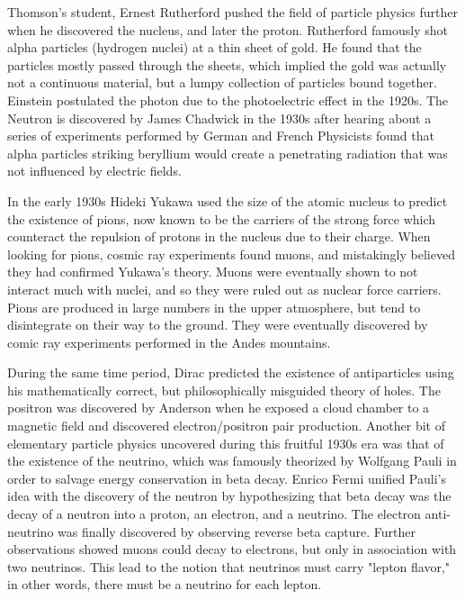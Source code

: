    Thomson's student, Ernest Rutherford pushed the field of particle physics further when he discovered the nucleus, and later the proton. Rutherford famously shot alpha particles (hydrogen nuclei) at a thin sheet of gold. He found that the particles mostly passed through the sheets, which implied the gold was actually not a continuous material, but a lumpy collection of particles bound together. Einstein postulated the photon due to the photoelectric effect in the 1920s. The Neutron is discovered by James Chadwick in the 1930s after hearing about a series of experiments performed by German and French Physicists found that alpha particles striking beryllium would create a penetrating radiation that was not influenced by electric fields. 

   In the early 1930s Hideki Yukawa used the size of the atomic nucleus to predict the existence of pions, now known to be the carriers of the strong force which counteract the repulsion of protons in the nucleus due to their charge. When looking for pions, cosmic ray experiments found muons, and mistakingly believed they had confirmed Yukawa's theory. Muons were eventually shown to not interact much with nuclei, and so they were ruled out as nuclear force carriers. Pions are produced in large numbers in the upper atmosphere, but tend to disintegrate on their way to the ground. They were eventually discovered by comic ray experiments performed in the Andes mountains.

   During the same time period, Dirac predicted the existence of antiparticles using his mathematically correct, but philosophically misguided theory of holes. The positron was discovered by Anderson when he exposed a cloud chamber to a magnetic field and discovered electron/positron pair production. Another bit of elementary particle physics uncovered during this fruitful 1930s era was that of the existence of the neutrino, which was famously theorized by Wolfgang Pauli in order to salvage energy conservation in beta decay. Enrico Fermi unified Pauli's idea with the discovery of the neutron by hypothesizing that beta decay was the decay of a neutron into a proton, an electron, and a neutrino. The electron anti-neutrino was finally discovered by observing reverse beta capture. Further observations showed muons could decay to electrons, but only in association with two neutrinos. This lead to the notion that neutrinos must carry "lepton flavor," in other words, there must be a neutrino for each lepton.


